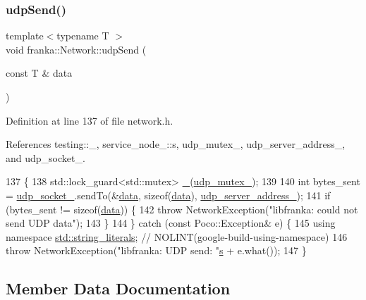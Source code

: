 \subsubsection{\texorpdfstring{udp\+Send()}{udpSend()}}
{\footnotesize\ttfamily template$<$typename T $>$ \\
void franka\+::\+Network\+::udp\+Send (\begin{DoxyParamCaption}\item[{const T \&}]{data }\end{DoxyParamCaption})}



Definition at line 137 of file network.\+h.



References testing\+::\+\_\+, service\+\_\+node\+\_\+::s, udp\+\_\+mutex\+\_\+, udp\+\_\+server\+\_\+address\+\_\+, and udp\+\_\+socket\+\_\+.


\begin{DoxyCode}
137                                        \{
138   std::lock\_guard<std::mutex> \hyperlink{namespacetesting_a4ba77a3f5b67166ff1b59d96a32346a2}{\_}(\hyperlink{classfranka_1_1Network_ab22bfa46c27a565336d6231971b019be}{udp\_mutex\_});
139 
140   \textcolor{keywordtype}{int} bytes\_sent = \hyperlink{classfranka_1_1Network_ac09fea0946977e7c366ad4a3421ef621}{udp\_socket\_}.sendTo(&\hyperlink{namespacekeyboard__server__node_abfec01745fb17e2aa813913bea03d707}{data}, \textcolor{keyword}{sizeof}(\hyperlink{namespacekeyboard__server__node_abfec01745fb17e2aa813913bea03d707}{data}), 
      \hyperlink{classfranka_1_1Network_a5c87db65f0818d727b797e7da8d71334}{udp\_server\_address\_});
141   \textcolor{keywordflow}{if} (bytes\_sent != \textcolor{keyword}{sizeof}(\hyperlink{namespacekeyboard__server__node_abfec01745fb17e2aa813913bea03d707}{data})) \{
142     \textcolor{keywordflow}{throw} NetworkException(\textcolor{stringliteral}{"libfranka: could not send UDP data"});
143   \}
144 \} \textcolor{keywordflow}{catch} (\textcolor{keyword}{const} Poco::Exception& e) \{
145   \textcolor{keyword}{using namespace }\hyperlink{namespacestd_1_1string__literals}{std::string\_literals};  \textcolor{comment}{// NOLINT(google-build-using-namespace)}
146   \textcolor{keywordflow}{throw} NetworkException(\textcolor{stringliteral}{"libfranka: UDP send: "}\hyperlink{namespaceservice__node__3_aa976421a49e0b54f23833423400849ae}{s} + e.what());
147 \}
\end{DoxyCode}


\subsection{Member Data Documentation}
\mbox{\label{classfranka_1_1Network_a3c0593618dbdedb1edb9ef2ef9392f19}} 
